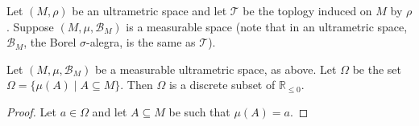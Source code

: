 Let $(M, \rho)$ be an ultrametric space and let $\mathcal{T}$ be the toplogy induced on $M$ by $\rho$. Suppose $(M, \mu, \mathcal{B}_M)$ is a measurable space (note that in an ultrametric space, $\mathcal{B}_M$, the Borel $\sigma$-alegra, is the same as $\mathcal{T}$). 

\begin{theorem}
Let $(M, \mu, \mathcal{B}_M)$ be a measurable ultrametric space, as above. Let $\Omega$ be the set $\Omega = \{\mu(A) \mid A \subseteq M\}$. Then $\Omega$ is a discrete subset of $\mathbb{R}_{\leq 0}$.   
\end{theorem}

\begin{proof}
Let $a \in \Omega$ and let $A \subseteq M$ be such that $\mu(A)=a$. 	
\end{proof}
